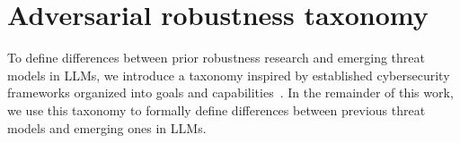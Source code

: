 \vspace{-10pt}
\section{Adversarial robustness taxonomy}

To define differences between prior robustness research and emerging threat models in LLMs, we introduce a taxonomy inspired by established cybersecurity frameworks organized into goals and capabilities~\citep{papernot_practical_2017, carlini_evaluating_2019}. In the remainder of this work, we use this taxonomy to formally define differences between previous threat models and emerging ones in LLMs.

\vspace{-5pt}
